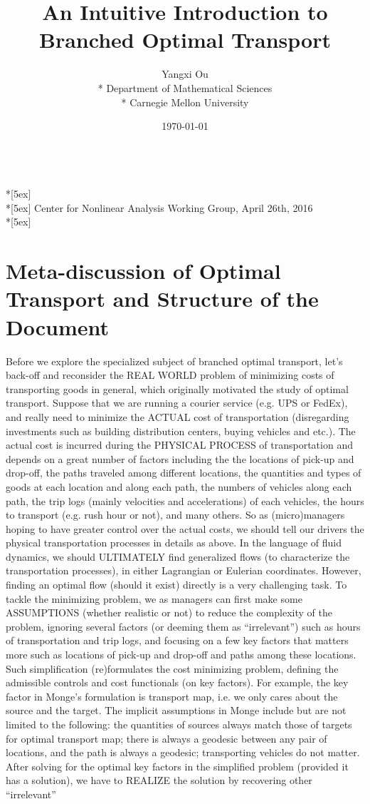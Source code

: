 \documentclass[fleqn]{article}
\title{An Intuitive Introduction to Branched Optimal Transport}
\author{Yangxi Ou \\* Department of Mathematical Sciences \\* Carnegie Mellon University}
\date{\today}
\theoremstyle{definition}
\theoremstyle{remark}
\begin{document}
\begin{center}	
	\textbf{\Large \thetitle} \\*[5ex]
	\theauthor \\*[5ex]
	Center for Nonlinear Analysis Working Group, April 26th, 2016 \\*[5ex]
	\tableofcontents
\end{center}
	
\vspace{10ex}

\doublespacing

\section{Meta-discussion of Optimal Transport and Structure of the Document} \label{sec:meta}
Before we explore the specialized subject of branched optimal transport, let's back-off and reconsider the REAL WORLD problem of minimizing costs of transporting goods in general, which originally motivated the study of optimal transport. Suppose that we are running a courier service (e.g. UPS or FedEx), and really need to minimize the ACTUAL cost of transportation (disregarding investments such as building distribution centers, buying vehicles and etc.). The actual cost is incurred during the PHYSICAL PROCESS of transportation and depends on a great number of factors including the the locations of pick-up and drop-off, the paths traveled among different locations, the quantities and types of goods at each location and along each path, the numbers of vehicles along each path, the trip logs (mainly velocities and accelerations) of each vehicles, the hours to transport (e.g. rush hour or not), and many others. So as (micro)managers hoping to have greater control over the actual costs, we should tell our drivers the physical transportation processes in details as above. In the language of fluid dynamics, we should ULTIMATELY find generalized flows (to characterize the transportation processes), in either Lagrangian or Eulerian coordinates. However, finding an optimal flow (should it exist) directly is a very challenging task. To tackle the minimizing problem, we as managers can first make some ASSUMPTIONS (whether realistic or not) to reduce the complexity of the problem, ignoring several factors (or deeming them as ``irrelevant'') such as hours of transportation and trip logs, and focusing on a few key factors that matters more such as locations of pick-up and drop-off and paths among these locations. Such simplification (re)formulates the cost minimizing problem, defining the admissible controls and cost functionals (on key factors). For example, the key factor in Monge's formulation is transport map, i.e. we only cares about the source and the target. The implicit assumptions in Monge include but are not limited to the following: the quantities of sources always match those of targets for optimal transport map; there is always a geodesic between any pair of locations, and the path is always a geodesic; transporting vehicles do not matter. After solving for the optimal key factors in the simplified problem (provided it has a solution), we have to REALIZE the solution by recovering other ``irrelevant'' 
\end{document}
